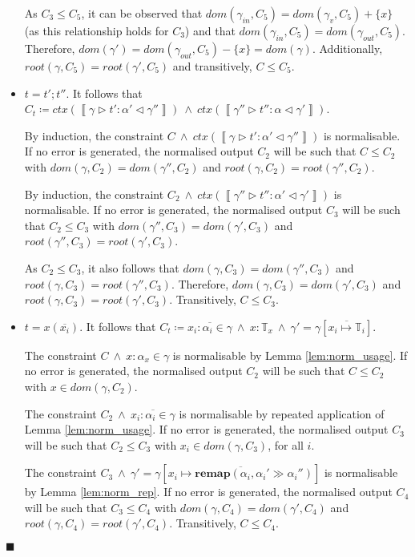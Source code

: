 \documentclass[preprint]{sigplanconf}
\newcommand{\lemref}[1]{Lemma \ref{#1}}
\newcommand{\remapapp}[3]{\ensuremath{\mathbf{remap}(#1, #2 \gg #3)}}
\newcommand{\inferrule}[4]{\left\llbracket #1 \triangleright #2 : #3 \triangleleft #4 \right\rrbracket}
\newcommand{\cand}{\:\wedge\:}
\newcommand{\tinf}{\mathbb{T}}
\newcommand{\qed}{$\blacksquare$}
\newenvironment{proof}{\vspace{1ex}\noindent{\bf Proof}\hspace{0.5em}}
  {\hfill\qed\vspace{1ex}}
\begin{document}
\begin{proof}
\begin{itemize}
As $C_3 \leq C_5$, it can be observed that $dom(\gamma_{in}, C_5) = dom(\gamma_v, C_5) + \{x\}$ (as this relationship holds for $C_3$) and that 
$dom(\gamma_{in}, C_5) = dom(\gamma_{out}, C_5)$. Therefore, $dom(\gamma') = dom(\gamma_{out}, C_5) - \{x\} = dom(\gamma)$. Additionally, $root(\gamma, C_5) = root(\gamma', C_5)$ and transitively, $C \leq C_5$.

\item $t = t' ; t''$.
It follows that
$C_t \coloneqq 
ctx(\inferrule{\gamma}{t'}{\alpha'}{\gamma''}) \cand
ctx(\inferrule{\gamma''}{t''}{\alpha}{\gamma'})$.

By induction, the constraint 
$C \cand ctx(\inferrule{\gamma}{t'}{\alpha'}{\gamma''})$ is normalisable.
If no error is generated, the normalised output $C_2$ will be such that
$C \leq C_2$ with $dom(\gamma, C_2) = dom(\gamma'', C_2)$ and
$root(\gamma, C_2) = root(\gamma'', C_2)$.

By induction, the constraint
$C_2 \cand ctx(\inferrule{\gamma''}{t''}{\alpha'}{\gamma'})$ is normalisable.
If no error is generated, the normalised output $C_3$ will be such that
$C_2 \leq C_3$ with $dom(\gamma'', C_3) = dom(\gamma', C_3)$ and
$root(\gamma'', C_3) = root(\gamma', C_3)$.

As $C_2 \leq C_3$, it also follows that $dom(\gamma, C_3) = dom(\gamma'', C_3)$
and $root(\gamma, C_3) = root(\gamma'', C_3)$. Therefore,
$dom(\gamma, C_3) = dom(\gamma', C_3)$ and 
$root(\gamma, C_3) = root(\gamma', C_3)$. Transitively, $C \leq C_3$.

\item $t = x(\overline{x_i})$.
It follows that
$C_t \coloneqq \overline{x_i : \alpha_i \in \gamma} \cand 
x : \tinf_x \cand
\gamma' = \gamma[\overline{x_i \mapsto \tinf_i}]
$.

The constraint $C \cand x : \alpha_x \in \gamma$ is normalisable by 
\lemref{lem:norm_usage}. If no error is generated, the normalised output $C_2$ will be such that $C \leq C_2$ with $x \in dom(\gamma, C_2)$.

The constraint $C_2 \cand \overline{x_i : \alpha_i \in \gamma}$ is normalisable
by repeated application of \lemref{lem:norm_usage}. If no error is generated, the normalised output $C_3$ will be such that $C_2 \leq C_3$ with
$x_i \in dom(\gamma, C_3)$, for all $i$.

The constraint $C_3 \cand \gamma' = \gamma[\overline{x_i \mapsto \remapapp{\alpha_i}{\alpha_i'}{\alpha_i''}}]$
is normalisable by \lemref{lem:norm_rep}. If no error is generated, the
normalised output $C_4$ will be such that $C_3 \leq C_4$ with
$dom(\gamma, C_4) = dom(\gamma', C_4)$ and $root(\gamma, C_4) = root(\gamma', C_4)$. Transitively, $C \leq C_4$.


\end{itemize}
\end{proof}
\end{document}
